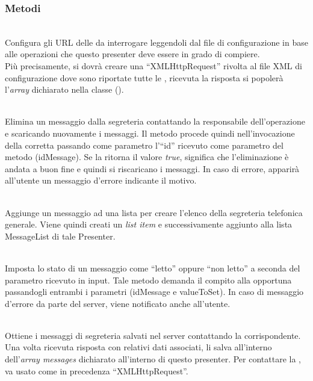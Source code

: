 \subsubsection*{Metodi}
\begin{description}
\item{}\\
Configura gli URL delle  da interrogare leggendoli dal file di configurazione in base alle operazioni che questo presenter deve essere in grado di compiere.\\
Più precisamente, si dovrà creare una ``XMLHttpRequest'' rivolta al file XML di configurazione dove sono riportate tutte le , ricevuta la risposta si popolerà l'\textit{array} dichiarato nella classe ().

\item{}\\
Elimina un messaggio dalla segreteria contattando la  responsabile dell'operazione e scaricando nuovamente i messaggi. Il metodo procede quindi nell'invocazione della  corretta passando come parametro l'``id'' ricevuto come parametro del metodo (idMessage). Se la  ritorna il valore \textit{true}, significa che l'eliminazione è andata a buon fine e quindi si riscaricano i messaggi. In caso di errore, apparirà all'utente un messaggio d'errore indicante il motivo.

\item{}\\
Aggiunge un messaggio ad una lista per creare l'elenco della segreteria telefonica generale. Viene quindi creati un \textit{list item} e successivamente aggiunto alla lista MessageList di tale Presenter.

\item{}\\
Imposta lo stato di un messaggio come ``letto'' oppure ``non letto'' a seconda del parametro ricevuto in input. Tale metodo demanda il compito alla  opportuna passandogli entrambi i parametri (idMessage e valueToSet). In caso di messaggio d'errore da parte del server, viene notificato anche all'utente.

\item{}\\
Ottiene i messaggi di segreteria salvati nel server contattando la  corrispondente. Una volta ricevuta risposta con relativi dati associati, li salva all'interno dell'\textit{array messages} dichiarato all'interno di questo presenter. Per contattare la , va usato come in precedenza ``XMLHttpRequest''.


\end{description}
